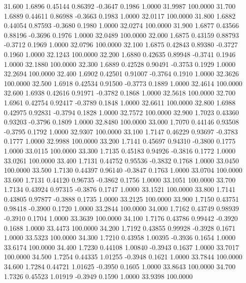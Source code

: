   31.600   1.6896   0.45144   0.86392  -0.3647   0.1986   1.0000  31.9987 100.0000
  31.700   1.6889   0.44611   0.86988  -0.3663   0.1983   1.0000  32.0117 100.0000
  31.800   1.6882   0.44054   0.87593  -0.3680   0.1980   1.0000  32.0274 100.0000
  31.900   1.6877   0.43566   0.88196  -0.3696   0.1976   1.0000  32.0489 100.0000
  32.000   1.6875   0.43159   0.88793  -0.3712   0.1969   1.0000  32.0796 100.0000
  32.100   1.6875   0.42843   0.89380  -0.3727   0.1960   1.0000  32.1243 100.0000
  32.200   1.6880   0.42635   0.89948  -0.3741   0.1946   1.0000  32.1880 100.0000
  32.300   1.6889   0.42528   0.90491  -0.3753   0.1929   1.0000  32.2694 100.0000
  32.400   1.6902   0.42501   0.91007  -0.3764   0.1910   1.0000  32.3626 100.0000
  32.500   1.6918   0.42534   0.91500  -0.3773   0.1889   1.0000  32.4614 100.0000
  32.600   1.6938   0.42616   0.91971  -0.3782   0.1868   1.0000  32.5618 100.0000
  32.700   1.6961   0.42754   0.92417  -0.3789   0.1848   1.0000  32.6611 100.0000
  32.800   1.6988   0.42975   0.92831  -0.3794   0.1828   1.0000  32.7572 100.0000
  32.900   1.7023   0.43360   0.93203  -0.3796   0.1809   1.0000  32.8480 100.0000
  33.000   1.7070   0.44146   0.93508  -0.3795   0.1792   1.0000  32.9307 100.0000
  33.100   1.7147   0.46229   0.93697  -0.3783   0.1777   1.0000  32.9988 100.0000
  33.200   1.7141   0.45697   0.94310  -0.3800   0.1775   1.0000  33.0115 100.0000
  33.300   1.7135   0.45183   0.94926  -0.3816   0.1772   1.0000  33.0261 100.0000
  33.400   1.7131   0.44752   0.95536  -0.3832   0.1768   1.0000  33.0450 100.0000
  33.500   1.7130   0.44397   0.96140  -0.3847   0.1763   1.0000  33.0704 100.0000
  33.600   1.7131   0.44120   0.96735  -0.3862   0.1756   1.0000  33.1051 100.0000
  33.700   1.7134   0.43924   0.97315  -0.3876   0.1747   1.0000  33.1521 100.0000
  33.800   1.7141   0.43805   0.97877  -0.3888   0.1735   1.0000  33.2125 100.0000
  33.900   1.7150   0.43751   0.98418  -0.3900   0.1720   1.0000  33.2844 100.0000
  34.000   1.7162   0.43749   0.98939  -0.3910   0.1704   1.0000  33.3639 100.0000
  34.100   1.7176   0.43786   0.99442  -0.3920   0.1688   1.0000  33.4473 100.0000
  34.200   1.7192   0.43855   0.99928  -0.3928   0.1671   1.0000  33.5323 100.0000
  34.300   1.7210   0.43958   1.00395  -0.3936   0.1654   1.0000  33.6174 100.0000
  34.400   1.7230   0.44108   1.00840  -0.3943   0.1637   1.0000  33.7017 100.0000
  34.500   1.7254   0.44335   1.01255  -0.3948   0.1621   1.0000  33.7844 100.0000
  34.600   1.7284   0.44721   1.01625  -0.3950   0.1605   1.0000  33.8643 100.0000
  34.700   1.7326   0.45523   1.01919  -0.3949   0.1590   1.0000  33.9398 100.0000
